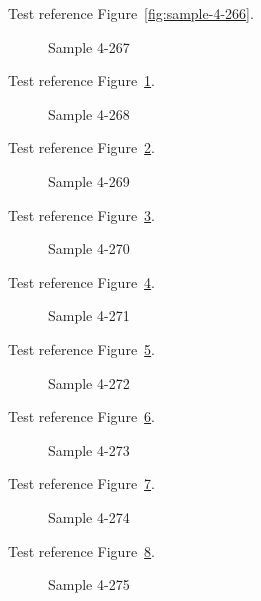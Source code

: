 Test reference Figure~\ref{fig:sample-4-266}.

\begin{figure}[tbhp]
\caption{Sample 4-267}
\label{fig:sample-4-267}
\end{figure}

Test reference Figure~\ref{fig:sample-4-267}.

\begin{figure}[tbhp]
\caption{Sample 4-268}
\label{fig:sample-4-268}
\end{figure}

Test reference Figure~\ref{fig:sample-4-268}.

\begin{figure}[tbhp]
\caption{Sample 4-269}
\label{fig:sample-4-269}
\end{figure}

Test reference Figure~\ref{fig:sample-4-269}.

\begin{figure}[tbhp]
\caption{Sample 4-270}
\label{fig:sample-4-270}
\end{figure}

Test reference Figure~\ref{fig:sample-4-270}.

\begin{figure}[tbhp]
\caption{Sample 4-271}
\label{fig:sample-4-271}
\end{figure}

Test reference Figure~\ref{fig:sample-4-271}.

\begin{figure}[tbhp]
\caption{Sample 4-272}
\label{fig:sample-4-272}
\end{figure}

Test reference Figure~\ref{fig:sample-4-272}.

\begin{figure}[tbhp]
\caption{Sample 4-273}
\label{fig:sample-4-273}
\end{figure}

Test reference Figure~\ref{fig:sample-4-273}.

\begin{figure}[tbhp]
\caption{Sample 4-274}
\label{fig:sample-4-274}
\end{figure}

Test reference Figure~\ref{fig:sample-4-274}.

\begin{figure}[tbhp]
\caption{Sample 4-275}
\label{fig:sample-4-275}
\end{figure}

